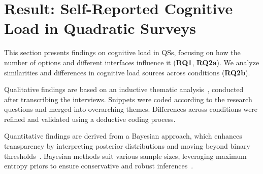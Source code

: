 \section{Result: Self-Reported Cognitive Load in Quadratic Surveys}
\label{sec:cog}
This section presents findings on cognitive load in QSs, focusing on how the number of options and different interfaces influence it (\textbf{RQ1}, \textbf{RQ2a}). We analyze similarities and differences in cognitive load sources across conditions (\textbf{RQ2b}).

Qualitative findings are based on an inductive thematic analysis~\cite{olsonWaysKnowingHCI2014}, conducted after transcribing the interviews. Snippets were coded according to the research questions and merged into overarching themes. Differences across conditions were refined and validated using a deductive coding process.

Quantitative findings are derived from a Bayesian approach, which enhances transparency by interpreting posterior distributions and moving beyond binary thresholds~\cite{kay2016researcher}. Bayesian methods suit various sample sizes, leveraging maximum entropy priors to ensure conservative and robust inferences~\cite{mcelreath2018statistical}.

